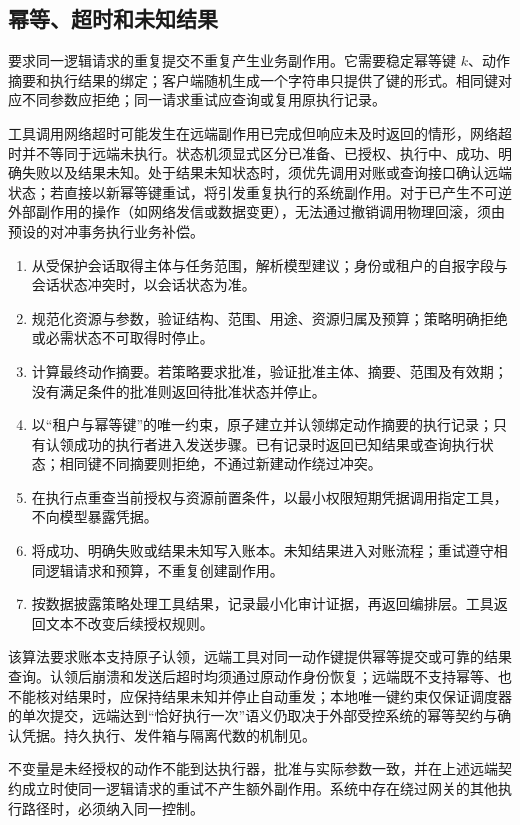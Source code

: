 \documentclass[../textbook.tex]{subfiles}
\begin{document}
\subsection{幂等、超时和未知结果}
要求同一逻辑请求的重复提交不重复产生业务副作用。它需要稳定幂等键 $k$、动作摘要和执行结果的绑定；客户端随机生成一个字符串只提供了键的形式。相同键对应不同参数应拒绝；同一请求重试应查询或复用原执行记录。

工具调用网络超时可能发生在远端副作用已完成但响应未及时返回的情形，网络超时并不等同于远端未执行。状态机须显式区分已准备、已授权、执行中、成功、明确失败以及结果未知。处于结果未知状态时，须优先调用对账或查询接口确认远端状态；若直接以新幂等键重试，将引发重复执行的系统副作用。对于已产生不可逆外部副作用的操作（如网络发信或数据变更），无法通过撤销调用物理回滚，须由预设的对冲事务执行业务补偿。

\begin{algorithm}[受控工具执行]
\begin{enumerate}
 \item 从受保护会话取得主体与任务范围，解析模型建议；身份或租户的自报字段与会话状态冲突时，以会话状态为准。
 \item 规范化资源与参数，验证结构、范围、用途、资源归属及预算；策略明确拒绝或必需状态不可取得时停止。
 \item 计算最终动作摘要。若策略要求批准，验证批准主体、摘要、范围及有效期；没有满足条件的批准则返回待批准状态并停止。
 \item 以“租户与幂等键”的唯一约束，原子建立并认领绑定动作摘要的执行记录；只有认领成功的执行者进入发送步骤。已有记录时返回已知结果或查询执行状态；相同键不同摘要则拒绝，不通过新建动作绕过冲突。
 \item 在执行点重查当前授权与资源前置条件，以最小权限短期凭据调用指定工具，不向模型暴露凭据。
 \item 将成功、明确失败或结果未知写入账本。未知结果进入对账流程；重试遵守相同逻辑请求和预算，不重复创建副作用。
 \item 按数据披露策略处理工具结果，记录最小化审计证据，再返回编排层。工具返回文本不改变后续授权规则。
\end{enumerate}
该算法要求账本支持原子认领，远端工具对同一动作键提供幂等提交或可靠的结果查询。认领后崩溃和发送后超时均须通过原动作身份恢复；远端既不支持幂等、也不能核对结果时，应保持结果未知并停止自动重发；本地唯一键约束仅保证调度器的单次提交，远端达到“恰好执行一次”语义仍取决于外部受控系统的幂等契约与确认凭据。持久执行、发件箱与隔离代数的机制见。

不变量是未经授权的动作不能到达执行器，批准与实际参数一致，并在上述远端契约成立时使同一逻辑请求的重试不产生额外副作用。系统中存在绕过网关的其他执行路径时，必须纳入同一控制。
\end{algorithm}
\end{document}
